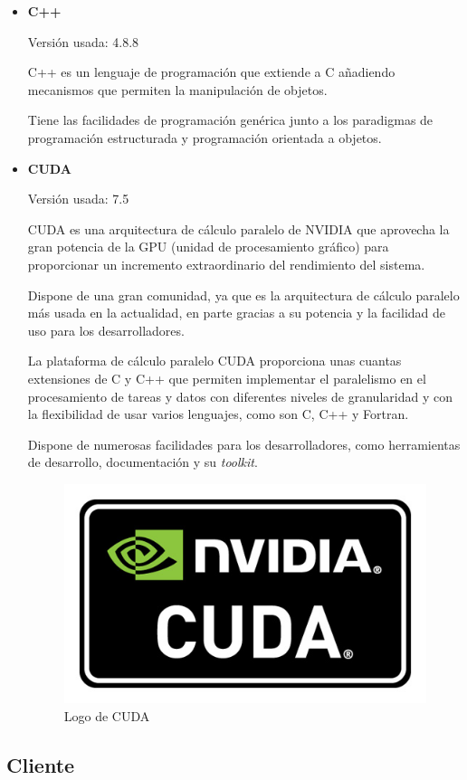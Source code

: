 \begin{itemize}
	\item \textbf{C++}
	
	Versión usada: 4.8.8
	
	C++ \cite{cpp} es un lenguaje de programación que extiende a C añadiendo mecanismos que permiten la manipulación de objetos. 
	
	Tiene las facilidades de programación genérica junto a los paradigmas de programación estructurada y programación orientada a objetos. 
		 
	
	\item \textbf{CUDA}
	
	Versión usada: 7.5
	
	CUDA \cite{nvidiacuda} es una arquitectura de cálculo paralelo de NVIDIA que aprovecha la gran potencia de la GPU (unidad de procesamiento gráfico) para proporcionar un incremento extraordinario del rendimiento del sistema.
	
	Dispone de una gran comunidad, ya que es la arquitectura de cálculo paralelo más usada en la actualidad, en parte gracias a su potencia y la facilidad de uso para los desarrolladores.

	
	La plataforma de cálculo paralelo CUDA proporciona unas cuantas extensiones de C y C++ que permiten implementar el paralelismo en el procesamiento de tareas y datos con diferentes niveles de granularidad y con la flexibilidad de usar varios lenguajes, como son C, C++ y Fortran. 
	
	Dispone de numerosas facilidades para los desarrolladores, como herramientas de desarrollo, documentación y su \textit{toolkit}.

		\bigskip
		\begin{figure}[h]
			\centering
			\includegraphics[width=0.3\linewidth]{../images/cudalogo}
			\caption[Logo de CUDA]{Logo de CUDA}
			\label{fig:cudalogo}
		\end{figure}
	
			
\end{itemize}
	

\bigskip
\subsection{Cliente}
\bigskip


